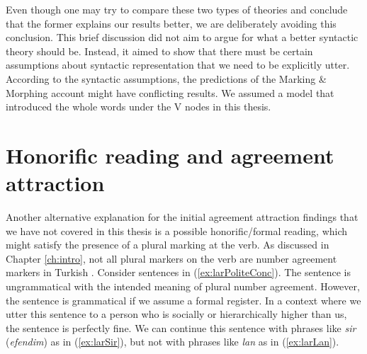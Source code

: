 Even though one may try to compare these two types of theories and conclude that the former explains our results better, we are deliberately avoiding this conclusion. This brief discussion did not aim to argue for what a better syntactic theory should be. Instead, it aimed to show that there must be certain assumptions about syntactic representation that we need to be explicitly utter. According to the syntactic assumptions, the predictions of the Marking \& Morphing account might have conflicting results. We assumed a model that introduced the whole words under the V nodes in this thesis. 

\section{Honorific reading and agreement attraction} \label{ch6hon}

Another alternative explanation for the initial agreement attraction findings that we have not covered in this thesis is a possible honorific/formal reading, which might satisfy the presence of a plural marking at the verb. As discussed in Chapter \ref{ch:intro}, not all plural markers on the verb are number agreement markers in Turkish \citep{GokselKerslake2005}. Consider sentences in (\ref{ex:larPoliteConc}). The sentence is ungrammatical with the intended meaning of plural number agreement. However, the sentence is grammatical if we assume a formal register. In a context where we utter this sentence to a person who is socially or hierarchically higher than us, the sentence is perfectly fine. We can continue this sentence with phrases like \emph{sir} (\emph{efendim}) as in (\ref{ex:larSir}),  but not with phrases like \emph{lan} as in (\ref{ex:larLan}).

\ea 
    \z
\z

